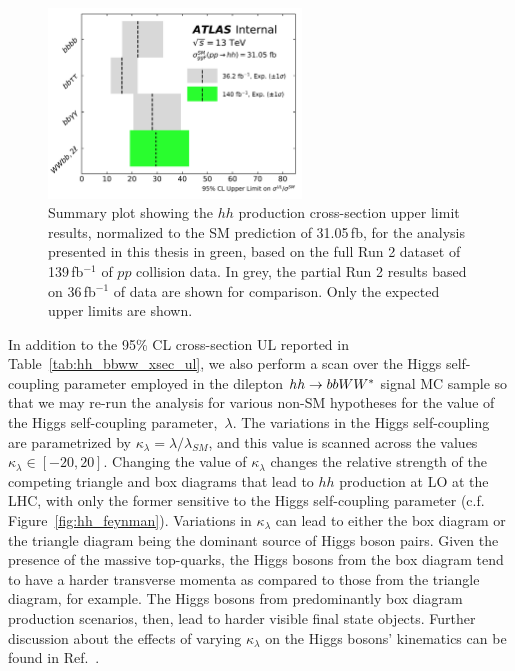 \begin{figure}[!htb]
    \begin{center}
        \includegraphics[width=0.6\textwidth]{figures/search_hh/results/hh_ul_compPDF}
        \caption{
            Summary plot showing the $hh$ production cross-section upper limit results, normalized to
            the SM prediction of 31.05\,fb, for the analysis presented in this thesis in green,
            based on the full Run 2 dataset of 139\,fb$^{-1}$ of $pp$ collision data.
            In grey, the partial Run 2 results based on 36\,fb$^{-1}$ of data are shown for comparison.
            Only the expected upper limits are shown.
        }
        \label{fig:hh_ul_comp}
    \end{center}
\end{figure}

In addition to the 95\% CL cross-section UL reported in Table~\ref{tab:hh_bbww_xsec_ul}, we also perform
a scan over the Higgs self-coupling parameter employed in the dilepton $hh \rightarrow bbWW^*$ signal MC sample
so that we may re-run the analysis for various non-SM hypotheses for the value of the Higgs self-coupling parameter,~$\lambda$.
The variations in the Higgs self-coupling are parametrized by $\kappa_{\lambda} = \lambda / \lambda_{SM}$, and this
value is scanned across the values $\kappa_{\lambda} \in [-20, 20]$.
Changing the value of $\kappa_{\lambda}$ changes the relative strength of the competing triangle
and box diagrams that lead to $hh$ production at LO at the LHC, with only the former sensitive to
the Higgs self-coupling parameter (c.f. Figure~\ref{fig:hh_feynman}).
Variations in $\kappa_{\lambda}$ can lead to either the box diagram or the triangle diagram being the dominant source of Higgs boson pairs.
Given the presence of the massive top-quarks, the Higgs bosons from the box diagram tend to have a harder transverse momenta
as compared to those from the triangle diagram, for example.
The Higgs bosons from predominantly box diagram production scenarios, then, lead to harder visible final state objects.
Further discussion about the effects of varying $\kappa_{\lambda}$ on the Higgs bosons' kinematics can
be found in Ref.~\cite{HHComb36}.

